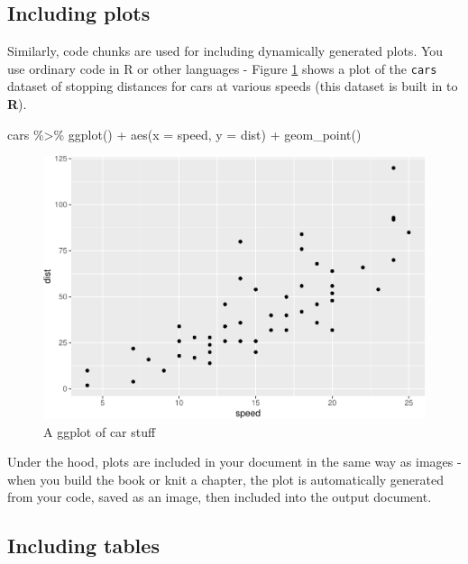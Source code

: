 \documentclass[a4paper, twoside]{templates/ociamthesis}
\newenvironment{Shaded}{\begin{snugshade}}{\end{snugshade}}
\newcommand{\AttributeTok}[1]{\textcolor[rgb]{0.77,0.63,0.00}{#1}}
\newcommand{\FunctionTok}[1]{\textcolor[rgb]{0.00,0.00,0.00}{#1}}
\newcommand{\NormalTok}[1]{#1}
\newcommand{\SpecialCharTok}[1]{\textcolor[rgb]{0.00,0.00,0.00}{#1}}
\renewenvironment{Shaded}
{
  \vspace{10pt}%
  \begin{snugshade}%
}{%
  \end{snugshade}%
  \vspace{8pt}%
}
\begin{document}
\hypertarget{including-plots}{%
\subsection{Including plots}\label{including-plots}}

Similarly, code chunks are used for including dynamically generated plots.
You use ordinary code in R or other languages - Figure \ref{fig:cars-plot} shows a plot of the \texttt{cars} dataset of stopping distances for cars at various speeds (this dataset is built in to \textbf{R}).

\begin{Shaded}
\begin{Highlighting}[]
\NormalTok{cars }\SpecialCharTok{\%\textgreater{}\%} 
  \FunctionTok{ggplot}\NormalTok{() }\SpecialCharTok{+}
    \FunctionTok{aes}\NormalTok{(}\AttributeTok{x =}\NormalTok{ speed, }\AttributeTok{y =}\NormalTok{ dist) }\SpecialCharTok{+}
    \FunctionTok{geom\_point}\NormalTok{()}
\end{Highlighting}
\end{Shaded}

\begin{figure}
\centering
\includegraphics{_main_files/figure-latex/cars-plot-1.pdf}
\caption{\label{fig:cars-plot}A ggplot of car stuff}
\end{figure}

Under the hood, plots are included in your document in the same way as images - when you build the book or knit a chapter, the plot is automatically generated from your code, saved as an image, then included into the output document.

\hypertarget{including-tables}{%
\subsection{Including tables}\label{including-tables}}
\end{document}
